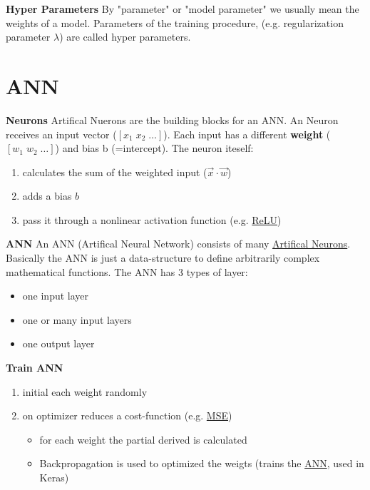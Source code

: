 \documentclass[11pt,twoside,landscape]{article}
\begin{document}
\begin{multicols}{3}
\textbf{Hyper Parameters}
By "parameter" or "model parameter" we usually mean the weights of a model.
Parameters of the training procedure, (e.g. regularization parameter \(\lambda\)) are called hyper parameters.

\section{ANN}
\label{sec:orgc0869a8}

\textbf{Neurons}
Artifical Nuerons are the building blocks for an ANN.
An Neuron receives an input vector (\([x_1 \; x_2 \; \ldots]\)).
Each input has a different \textbf{weight} (\([w_1 \; w_2 \; \ldots]\)) and bias b (=intercept).
The neuron iteself:
\begin{enumerate}
\item calculates the sum of the weighted input (\(\vec{x} \cdot \vec{w}\))
\item adds a bias \(b\)
\item pass it through a nonlinear activation function (e.g. \href{../../../roam/20211214121924-relu.org}{ReLU})
\end{enumerate}


\textbf{ANN}
An ANN (Artifical Neural Network) consists of many \href{../../../roam/20211214121841-artifical_neurons.org}{Artifical Neurons}.
Basically the ANN is just a data-structure to define arbitrarily complex mathematical functions.
The ANN has 3 types of layer:
\begin{itemize}
\item one input layer
\item one or many input layers
\item one output layer
\end{itemize}


\textbf{Train ANN}
\begin{enumerate}
\item initial each weight randomly
\item on optimizer reduces a cost-function (e.g. \href{../../../roam/20211004175550-mean_squared_error.org}{MSE})
\begin{itemize}
\item for each weight the partial derived is calculated
\item Backpropagation is used to optimized the weigts (trains the \href{../../../roam/20211214110732-ann.org}{ANN}, used in Keras)
\end{itemize}
\end{enumerate}


\end{multicols}
\end{document}
